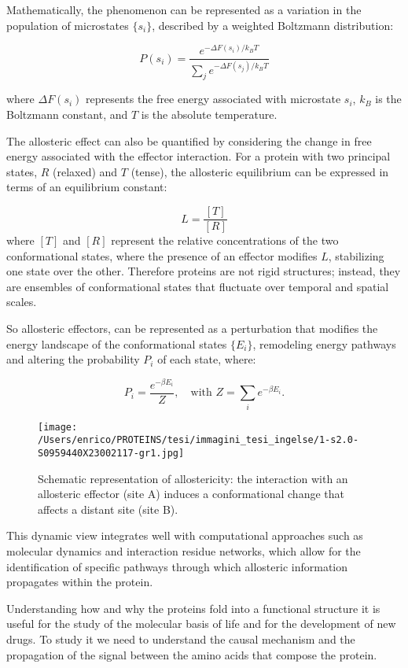 \documentclass[English, Lau, oneside]{sapthesis}
\begin{document}
Mathematically, the phenomenon can be represented as a variation in the population of microstates \(\{s_i\}\), described by a weighted Boltzmann distribution:\cite{ref6}

\[
P(s_i) = \frac{e^{-\Delta F(s_i)/k_BT}}{\sum_j e^{-\Delta F(s_j)/k_BT}}
\]

where \(\Delta F(s_i)\) represents the free energy associated with microstate \(s_i\), \(k_B\) is the Boltzmann constant, and \(T\) is the absolute temperature.

The allosteric effect can also be quantified by considering the change in free energy associated with the effector interaction. For a protein with two principal states, \(R\) (relaxed) and \(T\) (tense), the allosteric equilibrium can be expressed in terms of an equilibrium constant:\cite{ref6}

\[
L = \frac{[T]}{[R]}
\]
where \([T]\) and \([R]\) represent the relative concentrations of the two conformational states, where the presence of an effector modifies \(L\), stabilizing one state over the other.
Therefore proteins are not rigid structures; instead, they are ensembles of conformational states that fluctuate over temporal and spatial scales.

 So allosteric effectors,  can be represented as a perturbation that modifies the energy landscape of the conformational states \(\{E_i\}\), remodeling energy pathways and altering the probability \(P_i\) of each state, where:\cite{ref6}

\[
P_i = \frac{e^{-\beta E_i}}{Z}, \quad \text{with } Z = \sum_i e^{-\beta E_i}.
\]

\begin{figure}[h]
    \centering
    \texttt{[image: /Users/enrico/PROTEINS/tesi/immagini\_tesi\_ingelse/1-s2.0-S0959440X23002117-gr1.jpg]}
    \caption{Schematic representation of allostericity: the interaction with an allosteric effector (site A) induces a conformational change that affects a distant site (site B).}
    \label{fig:allostericity_dynamics}
\end{figure}

This dynamic view integrates well with computational approaches such as molecular dynamics and interaction residue networks, which allow for the identification of specific pathways through which allosteric information propagates within the protein.


Understanding how and why the proteins fold into a functional structure it is useful for the study of the molecular basis of life and for the development of new drugs.
To study it we need to understand the causal mechanism and the propagation of the signal between the amino acids that compose the protein.
\newpage
\end{document}
